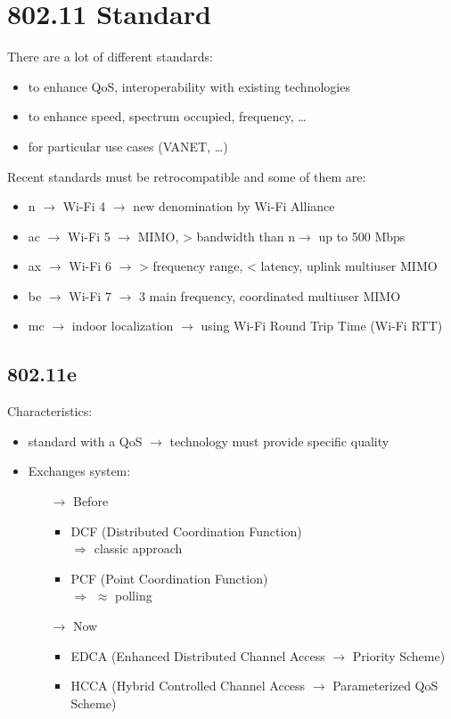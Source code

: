 \section{802.11 Standard}
There are a lot of different standards:
\begin{itemize}
    \item to enhance QoS, interoperability with existing technologies
    \item to enhance speed, spectrum occupied, frequency, \dots
    \item for particular use cases (VANET, \dots)
\end{itemize}
Recent standards must be retrocompatible and some of them are:
\begin{itemize}
    \item n $\rightarrow$ Wi-Fi 4 $\rightarrow$ new denomination by Wi-Fi Alliance
    \item ac $\rightarrow$ Wi-Fi 5 $\rightarrow$ MIMO, > bandwidth than n$\rightarrow$
    up to 500 Mbps
    \item ax $\rightarrow$ Wi-Fi 6 $\rightarrow$ > frequency range, < latency, uplink multiuser MIMO
    \item be $\rightarrow$ Wi-Fi 7 $\rightarrow$ 3 main frequency, coordinated multiuser MIMO
    \item mc $\rightarrow$ indoor localization $\rightarrow$ using Wi-Fi Round Trip Time (Wi-Fi RTT) 
\end{itemize}
\subsection{802.11e}
Characteristics:
\begin{itemize}
    \item standard with a QoS $\rightarrow$ technology must provide specific quality
    \item Exchanges system:
    \begin{itemize}
        \item[$\rightarrow$] Before
        \begin{itemize}
            \item DCF (Distributed Coordination Function)\\
            $\Rightarrow$ classic approach
            \item PCF (Point Coordination Function)\\
            $\Rightarrow$ $\approx$ polling 
        \end{itemize}
        \item[$\rightarrow$] Now
        \begin{itemize}
            \item EDCA (Enhanced Distributed Channel Access $\rightarrow$ Priority Scheme)
            \item HCCA (Hybrid Controlled Channel Access $\rightarrow$ Parameterized QoS Scheme)
        \end{itemize}
    \end{itemize}
\end{itemize}
